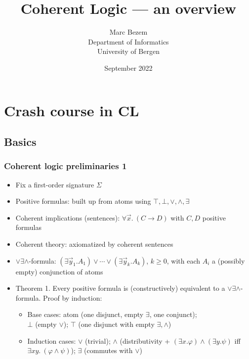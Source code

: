 \documentclass[handout,11pt]{beamer}
\title{Coherent Logic --- an overview}
\author{Marc Bezem\\
Department of Informatics\\
University of Bergen
}
\date{September 2022}
\newcommand{\deca}{${\lor}{\exists}{\land}$}
\begin{document}
\frame{\titlepage}

\section[Outline]{}
\frame{\tableofcontents}


\section{Crash course in CL}

\subsection{Basics}

\begin{frame}
\frametitle{Coherent logic preliminaries 1}
 \begin{itemize}[<+->]   %
    \item Fix a first-order signature $\Sigma$
    \item Positive formulas: built up from atoms using 
    $\top,\bot,\lor,\land,\exists$
    \item Coherent implications (sentences): $\forall\vec{x}.~(C \to D)$ 
    with $C,D$ positive formulas
    \item Coherent theory: axiomatized by coherent sentences
    \item \deca-formula: 
    $(\exists\vec{y}_1.A_1) \lor \cdots \lor (\exists\vec{y}_k.A_k)$,
    $k\geq 0$, with each $A_i$ a (possibly empty) conjunction of atoms
    \item Theorem 1. Every positive formula is (constructively) equivalent to
    a \deca-formula. Proof by induction:
    \begin{itemize}[<+->]   %
    \item Base cases: atom (one disjunct, empty $\exists$, one conjunct);\\ 
    $\bot$ (empty $\lor$); 
    $\top$ (one disjunct with empty $\exists,\land$)
    \item Induction cases: $\lor$ (trivial); 
    $\land$ (distributivity + $(\exists x.\varphi) \land (\exists y.\psi)$ iff 
                              $\exists xy.~(\varphi\land\psi)$);
    $\exists$ (commutes with $\vee$)    
    \end{itemize}
 \end{itemize}
\end{frame}
\end{document}
